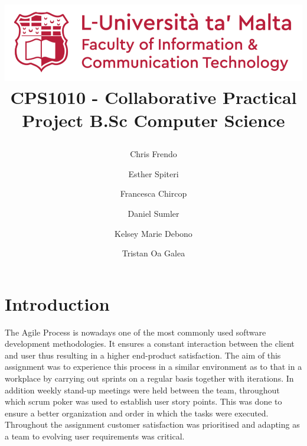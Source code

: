 \documentclass[12pt, a4paper]{report}
\begin{document}
\title{\includegraphics[scale = .8]{UoM_Logo_Side_New.png}
\linebreak 
\linebreak 
\linebreak
\linebreak
\linebreak 
\textbf{CPS1010 - Collaborative Practical Project}\linebreak\linebreak
\large{B.Sc Computer Science}
\author{Chris Frendo\and Esther Spiteri\and Francesca Chircop \and Daniel Sumler\and Kelsey Marie Debono\and Tristan Oa Galea}}
\maketitle

\tableofcontents

\titleformat{\chapter}[display]
{\normalfont\huge\bfseries}{}{20pt}{\Huge}

\titlespacing*{\chapter}{0pt}{-100pt}{40pt}

\chapter{Introduction}
The Agile Process is nowadays one of the most commonly used software development methodologies. It ensures a constant interaction between the client and user thus resulting in a higher end-product satisfaction. The aim of this assignment was to experience this process in a similar environment as to that in a workplace by carrying out sprints on a regular basis together with iterations. In addition weekly stand-up meetings were held between the team, throughout which scrum poker was used to establish user story points. This was done to ensure a better organization and order in which the tasks were executed. Throughout the assignment customer satisfaction was prioritised and adapting as a team to evolving user requirements was critical. 
\newline
\end{document}
